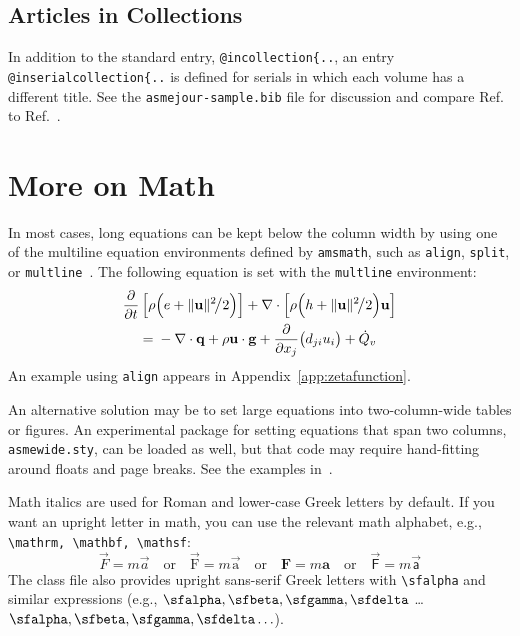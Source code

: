 \documentclass[subscriptcorrection,upint,varvw,barcolor=Goldenrod3,mathalfa=cal=euler,balance,hyphenate,french,pdf-a]{asmejour} %
\begin{document}
\subsection{Articles in Collections} In addition to the standard entry, \verb|@incollection{..|, an entry  \verb|@inserialcollection{..| is defined for serials in which each volume has a different title. See the \texttt{asmejour-sample.bib} file for discussion and compare Ref.~\cite{clauser56} to Ref.~\cite{DKE70}.

\section{More on Math}

In most cases, long equations can be kept below the column width by using one of the multiline equation environments defined by \texttt{amsmath}, 
such as \texttt{align}, \texttt{split}, or \texttt{multline}~\cite{amsmath}. The following equation is set with the \texttt{multline} environment:
\begin{multline}
\frac{\partial}{\partial t}\left[\rho\Bigl(e + \lVert\mathbf{u}\rVert^2\mspace{-3mu}\big/2\Bigr)\right]  + \nabla\cdot\left[\rho\Bigl(h + \lVert\mathbf{u}\rVert^2\mspace{-3mu}\big/2 \Bigr)\mathbf{u}\right]\\
 ={}-\nabla \cdot \mathbf{q} +  \rho \mathbf{u}\cdot\mathbf{g}+ \frac{\partial}{\partial x_j}\bigl(d_{ji}u_i\bigr) + \dot{Q}_v\label{eqn:energy}
\end{multline}
An example using \texttt{align} appears in Appendix~\ref{app:zetafunction}. 

An alternative solution may be to set large equations into two-column-wide tables or figures. An experimental package for setting equations that span two columns, \texttt{asmewide.sty}, can be loaded as well, but that code may require hand-fitting around floats and page breaks. See the examples in~\cite{lienhard2022}.

Math italics are used for Roman and lower-case Greek letters by default.  If you want an upright letter in math, you can use the relevant math alphabet, e.g., \verb|\mathrm, \mathbf, \mathsf|:
\begin{equation}\label{eqn:newton2}
\vec{F} = m \vec{a} \quad\textrm{or}\quad \vec{\mathrm{F}} = m \vec{\mathrm{a}} \quad\textrm{or}\quad \mathbf{F} = m \mathbf{a} \quad\textrm{or}\quad \vec{\mathsf{F}} = m \vec{\mathsf{a}}
\end{equation}
The class file also provides upright sans-serif Greek letters with \verb|\sfalpha| and similar expressions (e.g., $\sfalpha, \sfbeta, \sfgamma, \sfdelta$ \ldots $\bm{\sfalpha, \sfbeta, \sfgamma, \sfdelta \ldots}$). 
\end{document}
